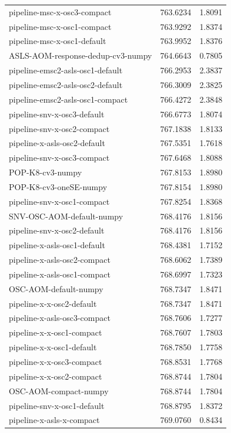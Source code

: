 \begin{tabular}{lrr}
pipeline-msc-x-osc3-compact & 763.6234 & 1.8091 \\
pipeline-msc-x-osc1-compact & 763.9292 & 1.8374 \\
pipeline-msc-x-osc1-default & 763.9952 & 1.8376 \\
ASLS-AOM-response-dedup-cv3-numpy & 764.6643 & 0.7805 \\
pipeline-emsc2-asls-osc1-default & 766.2953 & 2.3837 \\
pipeline-emsc2-asls-osc2-default & 766.3009 & 2.3825 \\
pipeline-emsc2-asls-osc1-compact & 766.4272 & 2.3848 \\
pipeline-snv-x-osc3-default & 766.6773 & 1.8074 \\
pipeline-snv-x-osc2-compact & 767.1838 & 1.8133 \\
pipeline-x-asls-osc2-default & 767.5351 & 1.7618 \\
pipeline-snv-x-osc3-compact & 767.6468 & 1.8088 \\
POP-K8-cv3-numpy & 767.8153 & 1.8980 \\
POP-K8-cv3-oneSE-numpy & 767.8154 & 1.8980 \\
pipeline-snv-x-osc1-compact & 767.8254 & 1.8368 \\
SNV-OSC-AOM-default-numpy & 768.4176 & 1.8156 \\
pipeline-snv-x-osc2-default & 768.4176 & 1.8156 \\
pipeline-x-asls-osc1-default & 768.4381 & 1.7152 \\
pipeline-x-asls-osc2-compact & 768.6062 & 1.7389 \\
pipeline-x-asls-osc1-compact & 768.6997 & 1.7323 \\
OSC-AOM-default-numpy & 768.7347 & 1.8471 \\
pipeline-x-x-osc2-default & 768.7347 & 1.8471 \\
pipeline-x-asls-osc3-compact & 768.7606 & 1.7277 \\
pipeline-x-x-osc1-compact & 768.7607 & 1.7803 \\
pipeline-x-x-osc1-default & 768.7850 & 1.7758 \\
pipeline-x-x-osc3-compact & 768.8531 & 1.7768 \\
pipeline-x-x-osc2-compact & 768.8744 & 1.7804 \\
OSC-AOM-compact-numpy & 768.8744 & 1.7804 \\
pipeline-snv-x-osc1-default & 768.8795 & 1.8372 \\
pipeline-x-asls-x-compact & 769.0760 & 0.8434 \\

\end{tabular}
